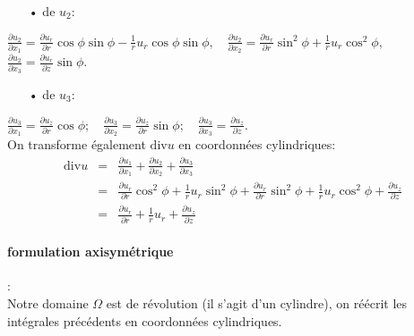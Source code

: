 \documentclass[a4paper,11pt]{article}   %
\begin{document}
\begin{itemize}
\item[•] de $u_2 :$ 
\end{itemize}


$\frac{\partial u_2}{\partial x_1} = \frac{\partial u_r}{\partial r}\cos\phi\sin\phi - \frac{1}{r}u_r \cos\phi\sin\phi, \ \ \ $
$\frac{\partial u_2}{\partial x_2} = \frac{\partial u_r}{\partial r}\sin^2\phi + \frac{1}{r} u_r\cos^2\phi, \ \ \ $
$ \frac{\partial u_2}{\partial x_3} = \frac{\partial u_r}{\partial z}\sin\phi.$ \\

\begin{itemize}
\item[•] de $u_3 :$ 
\end{itemize}

$ \frac{\partial u_3}{\partial x_1} = \frac{\partial u_z}{\partial r}\cos\phi;  \  \ \ $
$ \frac{\partial u_3}{\partial x_2} = \frac{\partial u_z}{\partial r}\sin\phi ;\ \ \ $
$\frac{\partial u_3}{\partial x_3} = \frac{\partial u_z}{\partial z}. $ \\

On transforme également $\mbox{div} u$ en coordonnées cylindriques: \\

\begin{eqnarray*}
 \mbox{div}u &=& \frac{\partial u_1}{\partial x_1} + \frac{\partial u_2}{\partial x_2} + \frac{\partial u_3}{\partial x_3} \\ &=& \frac{\partial u_r}{\partial r}\cos^2\phi + \frac{1}{r} u_r\sin^2\phi + \frac{\partial u_r}{\partial r}\sin^2\phi + \frac{1}{r} u_r\cos^2\phi + \frac{\partial u_z}{\partial z}  \\ &=& \frac{\partial u_r}{\partial r} + \frac{1}{r} u_r + \frac{\partial u_z}{\partial z}
\end{eqnarray*} 
 
\paragraph*{formulation axisymétrique}:\\
Notre domaine $\Omega$ est de révolution (il s'agit d'un cylindre), on réécrit les intégrales précédents en coordonnées cylindriques. \\
\end{document}
